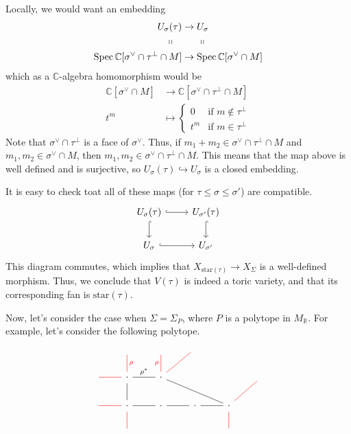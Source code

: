 \documentclass[a4paper,12pt]{amsart}
\newcommand{\RR}{\mathbb{R}}
\newcommand{\CC}{\mathbb{C}}
\DeclareMathOperator{\Spec}{Spec}
\begin{document}
\begin{example}
	Locally, we would want an embedding
	\begin{align*}
		U_\sigma(\tau)&\rightarrow U_\sigma\\
		\shortparallel\ \ \ &\quad\ \ \shortparallel\\
		\Spec\CC[\sigma^\vee\cap\tau^\perp\cap M]&\rightarrow\Spec\CC[\sigma^\vee\cap M]
	\end{align*}
	which as a $\CC$-algebra homomorphism would be
	\begin{align*}
		\CC[\sigma^\vee\cap M]&\rightarrow\CC[\sigma^\vee\cap\tau^\perp\cap M]\\
		t^m&\mapsto\begin{cases}
		0&\text{if }m\not\in\tau^\perp\\
		t^m&\text{if }m\in\tau^\perp
		\end{cases}
	\end{align*}
	Note that $\sigma^\vee\cap\tau^\perp$ is a face of $\sigma^\vee$. Thus, if $m_1+m_2\in\sigma^\vee\cap\tau^\perp\cap M$ and $m_1,m_2\in\sigma^\vee\cap M$, then $m_1,m_2\in\sigma^\vee\cap\tau^\perp\cap M$. This means that the map above is well defined and is surjective, so $U_\sigma(\tau)\hookrightarrow U_\sigma$ is a closed embedding.
\end{example}

It is easy to check toat all of these maps (for $\tau\leq\sigma\leq\sigma'$) are compatible.
$$\begin{tikzcd}
U_\sigma(\tau) \arrow[hookrightarrow]{r} \arrow[hookrightarrow]{d} & U_{\sigma'}(\tau) \arrow[hookrightarrow]{d}\\
U_\sigma \arrow[hookrightarrow]{r} & U_{\sigma'}
\end{tikzcd}$$
This diagram commutes, which implies that $X_{\text{star}(\tau)}\rightarrow X_\Sigma$ is a well-defined morphism. Thus, we conclude that $V(\tau)$ is indeed a toric variety, and that its corresponding fan is $\text{star}(\tau)$.

Now, let's consider the case when $\Sigma=\Sigma_P$, where $P$ is a polytope in $M_\RR$. For example, let's consider the following polytope.

$$ \begin{tikzcd}
\text{}& \text{} \arrow[d,red,dash,"\rho"]&\text{} & \text{} &      \\
\arrow[r,red,dash] &\cdot \arrow[r,dash,"\rho^*"] \arrow[d,dash] & \cdot \arrow[rrd, dash] \arrow[ur,red,dash]  \arrow[u,red,dash,"\rho"] & & &\text{}   \\
\arrow[r,red,dash]&\cdot \arrow[r,dash] \arrow[d,red,dash] &	\cdot &\cdot \arrow[l,dash]   &\cdot  \arrow[l,dash] \arrow[d,red,dash]\arrow[ru,red,dash] &   \\
&\text{} & & &	\text{}
\end{tikzcd}$$
\end{document}
